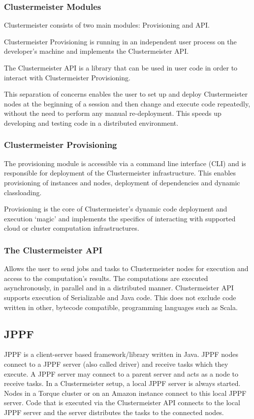 \documentclass[12pt]{article}
\begin{document}
\subsubsection{Clustermeister Modules}

Clustermeister consists of two main modules: Provisioning and API.

Clustermeister Provisioning is running in an independent user process on the developer's machine and implements the Clustermeister API.

The Clustermeister API is a library that can be used in user code in order to interact with Clustermeister Provisioning. 

This separation of concerns enables the user to set up and deploy Clustermeister nodes at the beginning of a session and then change and execute code repeatedly, without the need to perform any manual re-deployment. This speeds up developing and testing code in a distributed environment.

\subsubsection{Clustermeister Provisioning}
The provisioning module is accessible via a command line interface (CLI) and is responsible for deployment of the Clustermeister infrastructure. This enables provisioning of instances and nodes, deployment of dependencies and dynamic classloading.

Provisioning is the core of Clustermeister's dynamic code deployment and execution `magic' and implements the specifics of interacting with supported cloud or cluster computation infrastructures.

\subsubsection{The Clustermeister API}
Allows the user to send jobs and tasks to Clustermeister nodes for execution and access to the computation's results. The computations are executed asynchronously, in parallel and in a distributed manner. Clustermeister API supports execution of Serializable and Java code. This does not exclude code written in other, bytecode compatible, programming languages such as Scala.

\subsection{JPPF}

JPPF is a client-server based framework/library written in Java. JPPF nodes connect to a JPPF server (also called driver) and receive tasks which they execute. A JPPF server may connect to a parent server and acts as a node to receive tasks. In a Clustermeister setup, a local JPPF server is always started. Nodes in a Torque cluster or on an Amazon instance connect to this local JPPF server. Code that is executed via the Clustermeister API connects to the local JPPF server and the server distributes the tasks to the connected nodes.
\end{document}
